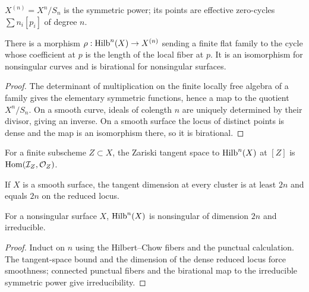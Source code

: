 \begin{definition}\label{fga-def-7-1-1}\uses{}
$X^{(n)}=X^n/S_n$ is the symmetric power; its points are effective zero-cycles
$\sum n_i[p_i]$ of degree $n$.
\end{definition}\begin{theorem}\label{fga-thm-7-1-2}
There is a morphism $\rho:\operatorname{Hilb}^n(X)\to X^{(n)}$ sending a finite flat family
to the cycle whose coefficient at $p$ is the length of the local fiber at $p$.
It is an isomorphism for nonsingular curves and is birational for nonsingular
surfaces.
\end{theorem}
\begin{proof}
The determinant of multiplication on the finite locally free algebra of a
family gives the elementary symmetric functions, hence a map to the quotient
$X^n/S_n$.  On a smooth curve, ideals of colength $n$ are uniquely determined
by their divisor, giving an inverse.  On a smooth surface the locus of distinct
points is dense and the map is an isomorphism there, so it is birational.
\end{proof}
\begin{lemma}\label{fga-lem-7-1-7}
For a finite subscheme $Z\subset X$, the Zariski tangent space to $\operatorname{Hilb}^n(X)$
at $[Z]$ is $\operatorname{Hom}(\mathcal I_Z,\mathcal O_Z)$.
\end{lemma}
\begin{lemma}\label{fga-lem-7-1-8}
If $X$ is a smooth surface, the tangent dimension at every cluster is at least
$2n$ and equals $2n$ on the reduced locus.
\end{lemma}
\begin{theorem}\label{fga-thm-7-1-13}
For a nonsingular surface $X$, $\operatorname{Hilb}^n(X)$ is nonsingular of dimension $2n$
and irreducible.
\end{theorem}
\begin{proof}
Induct on $n$ using the Hilbert--Chow fibers and the punctual calculation.
The tangent-space bound and the dimension of the dense reduced locus force
smoothness; connected punctual fibers and the birational map to the irreducible
symmetric power give irreducibility.
\end{proof}

